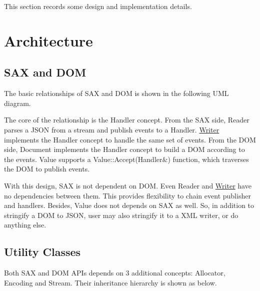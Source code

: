 This section records some design and implementation details.\hypertarget{md_Cadriciel_Commun_Externe_RapidJSON_doc_internals_Architecture}{}\section{Architecture}\label{md_Cadriciel_Commun_Externe_RapidJSON_doc_internals_Architecture}
\subsection*{S\+AX and D\+OM}

The basic relationships of S\+AX and D\+OM is shown in the following U\+ML diagram.



The core of the relationship is the {\ttfamily Handler} concept. From the S\+AX side, {\ttfamily Reader} parses a J\+S\+ON from a stream and publish events to a {\ttfamily Handler}. {\ttfamily \hyperlink{class_writer}{Writer}} implements the {\ttfamily Handler} concept to handle the same set of events. From the D\+OM side, {\ttfamily Document} implements the {\ttfamily Handler} concept to build a D\+OM according to the events. {\ttfamily Value} supports a {\ttfamily Value\+::\+Accept(\+Handler\&)} function, which traverses the D\+OM to publish events.

With this design, S\+AX is not dependent on D\+OM. Even {\ttfamily Reader} and {\ttfamily \hyperlink{class_writer}{Writer}} have no dependencies between them. This provides flexibility to chain event publisher and handlers. Besides, {\ttfamily Value} does not depends on S\+AX as well. So, in addition to stringify a D\+OM to J\+S\+ON, user may also stringify it to a X\+ML writer, or do anything else.

\subsection*{Utility Classes}

Both S\+AX and D\+OM A\+P\+Is depends on 3 additional concepts\+: {\ttfamily Allocator}, {\ttfamily Encoding} and {\ttfamily Stream}. Their inheritance hierarchy is shown as below.

